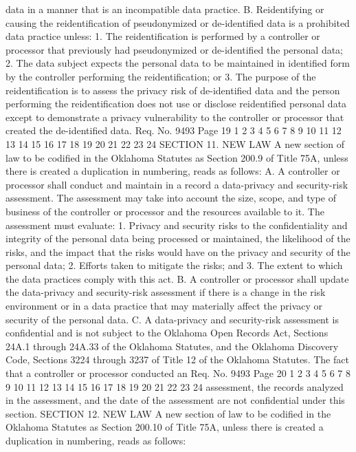 data in a manner that is an incompatible data practice.
B. Reidentifying or causing the reidentification of pseudonymized
or de-identified data is a prohibited data practice unless:
1. The reidentification is performed by a controller or processor
that previously had pseudonymized or de-identified the personal data;
2. The data subject expects the personal data to be maintained in
identified form by the controller performing the reidentification; or
3. The purpose of the reidentification is to assess the privacy
risk of de-identified data and the person performing the
reidentification does not use or disclose reidentified personal data
except to demonstrate a privacy vulnerability to the controller or
processor that created the de-identified data.
Req. No. 9493 Page 19
1
2
3
4
5
6
7
8
9
10
11
12
13
14
15
16
17
18
19
20
21
22
23
24
SECTION 11. NEW LAW A new section of law to be codified
in the Oklahoma Statutes as Section 200.9 of Title 75A, unless there
is created a duplication in numbering, reads as follows:
A. A controller or processor shall conduct and maintain in a
record a data-privacy and security-risk assessment. The assessment
may take into account the size, scope, and type of business of the
controller or processor and the resources available to it. The
assessment must evaluate:
1. Privacy and security risks to the confidentiality and
integrity of the personal data being processed or maintained, the
likelihood of the risks, and the impact that the risks would have on
the privacy and security of the personal data;
2. Efforts taken to mitigate the risks; and
3. The extent to which the data practices comply with this act.
B. A controller or processor shall update the data-privacy and
security-risk assessment if there is a change in the risk
environment or in a data practice that may materially affect the
privacy or security of the personal data.
C. A data-privacy and security-risk assessment is confidential
and is not subject to the Oklahoma Open Records Act, Sections 24A.1
through 24A.33 of the Oklahoma Statutes, and the Oklahoma Discovery
Code, Sections 3224 through 3237 of Title 12 of the Oklahoma
Statutes. The fact that a controller or processor conducted an 
Req. No. 9493 Page 20
1
2
3
4
5
6
7
8
9
10
11
12
13
14
15
16
17
18
19
20
21
22
23
24
assessment, the records analyzed in the assessment, and the date of
the assessment are not confidential under this section.
SECTION 12. NEW LAW A new section of law to be codified
in the Oklahoma Statutes as Section 200.10 of Title 75A, unless
there is created a duplication in numbering, reads as follows:
